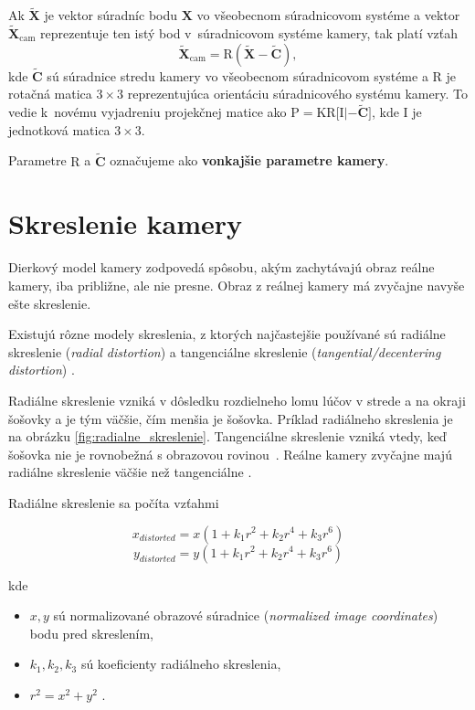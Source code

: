 Ak $\widetilde{\mathbf{X}}$ je vektor súradníc bodu $\mathbf{X}$ vo všeobecnom súradnicovom systéme a vektor $\widetilde{\mathbf{X}}_{\mathrm{cam}}$ reprezentuje ten istý bod v~súradnicovom systéme kamery, tak platí vzťah 
$$\widetilde{\mathbf{X}}_{\mathrm{cam}} = \mathrm{R} (\widetilde{\mathbf{X}} - \widetilde{\mathbf{C}}),$$ 
kde $\widetilde{\mathbf{C}}$ sú súradnice stredu kamery vo všeobecnom súradnicovom systéme a $\mathrm{R}$ je rotačná matica $3 \times 3$ reprezentujúca orientáciu súradnicového systému kamery. To vedie k~novému vyjadreniu projekčnej matice ako $\mathrm{P} = \mathrm{K} \mathrm{R} \bigl[ \mathrm{I} | - \widetilde{\mathbf{C}} \bigr]$, kde $\mathrm{I}$ je jednotková matica $3 \times 3$.

Parametre $\mathrm{R}$ a $\widetilde{\mathbf{C}}$ označujeme ako \textbf{vonkajšie parametre kamery}.

\section{Skreslenie kamery}
\label{sec:skreslenie}

Dierkový model kamery zodpovedá spôsobu, akým zachytávajú obraz reálne kamery, iba približne, ale nie presne. Obraz z reálnej kamery má zvyčajne navyše ešte skreslenie.

Existujú rôzne modely skreslenia, z ktorých najčastejšie používané sú radiálne skreslenie (\emph{radial distortion}) a tangenciálne skreslenie (\emph{tangential/decentering distortion}) \cite{sun_cooperstock_camera_calibration}.

Radiálne skreslenie vzniká v dôsledku rozdielneho lomu lúčov v strede a na okraji šošovky a je tým väčšie, čím menšia je šošovka. Príklad radiálneho skreslenia je na obrázku \ref{fig:radialne_skreslenie}. Tangenciálne skreslenie vzniká vtedy, keď šošovka nie je rovnobežná s obrazovou rovinou~\cite{matlab_camera_calibration}. Reálne kamery zvyčajne majú radiálne skreslenie väčšie než tangenciálne \cite{opencv_camera_calibration_older}.

Radiálne skreslenie sa počíta vzťahmi

$$x_{distorted} = x(1 + k_1 r^2 + k_2 r^4 + k_3 r^6)$$
$$y_{distorted} = y(1 + k_1 r^2 + k_2 r^4 + k_3 r^6)$$

kde

\begin{itemize}
    \item $x, y$ sú normalizované obrazové súradnice (\emph{normalized image coordinates}) bodu pred skreslením,
    \item $k_1, k_2, k_3$ sú koeficienty radiálneho skreslenia,
    \item $r^2 = x^2 + y^2$ \cite{opencv_camera_calibration}.
\end{itemize}


